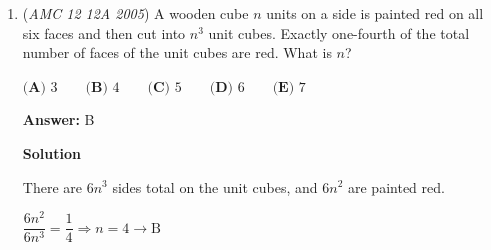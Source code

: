 \begin{enumerate}
 



\textbf{Solution 2 (Slow)}

We first rewrite $4x^2 + ax + 8x + 9 = 0$ as $4x^2 + (a+8)x + 9 = 0$. Since there is only one root, the discriminant, $(a+8)^2-144$, has to be 0. We expand $(a+8)^2$ as $a^2+16a+64$. Applying our discriminant rule yields:$a^2+16a+64-144=a^2+16a-80=0$.To apply the quadratic formula, we rewrite $a^2+16a-80$ as $a^2+16a+-80$.Then the formula yields:$\frac{-16\pm24}{2}$.Which is,$-8\pm12$.Notice that we have to find the sum of the two values, since the average is obviously $-8$, the sum is $2\cdot-8=\boxed{-16\text{ (A)}}$.~AVM2023

 



\textbf{Solution 3 (Quick)}

We first rewrite $4x^2 + ax + 8x + 9 = 0$ as $4x^2 + (a+8)x + 9 = 0$. Since there is only one root, the discriminant, $(a+8)^2-144$, has to be 0. We solve the remaining as below:$(a+8)^2-144=0$ so$(a+8)^2=144$.So $a+8$ is either $12$ or $-12$, which make $a$ either $4$ or $-20$, respectively. The sum of these values is $\boxed{-16\text{ (A)}}$.~AVM2023

 



\textbf{Solution 4 (Quickest)}

We first rewrite $4x^2 + ax + 8x + 9 = 0$ as $4x^2 + (a+8)x + 9 = 0$. Since there is only one root, the discriminant, $(a+8)^2-144$, has to be 0. We solve the remaining as below:$(a+8)^2-144=0$ so$(a+8)^2=144$.So $a+8$ is either $12$ or $-12$, which make $2a+16=0$, the sum, or $2a$, is $\boxed{-16\text{ (A)}}$.~AVM2023

 


	\item (\textit{AMC 12 12A 2005}) A wooden cube $n$ units on a side is painted red on all six faces and then cut into $n^3$ unit cubes. Exactly one-fourth of the total number of faces of the unit cubes are red. What is $n$? 


 $\textbf{(A) } 3 \qquad \textbf{(B) } 4 \qquad \textbf{(C) } 5 \qquad \textbf{(D) } 6 \qquad \textbf{(E) } 7$

 \textbf{Answer: }B



\textbf{Solution}

There are $6n^3$ sides total on the unit cubes, and $6n^2$ are painted red.

 $\dfrac{6n^2}{6n^3}=\dfrac{1}{4} \Rightarrow n=4 \rightarrow \mathrm {B}$




\end{enumerate}

